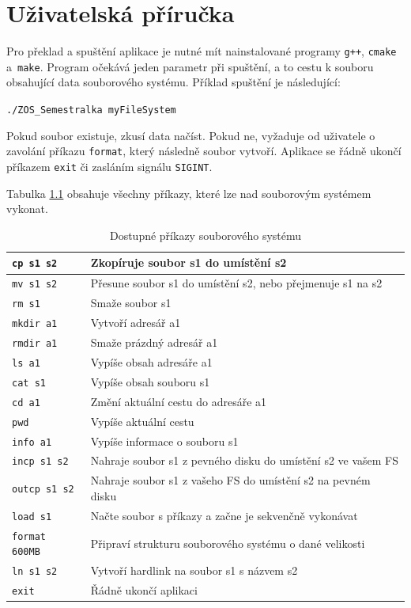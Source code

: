 \documentclass[12pt]{report}
\newcommand\indentt[1]{						
	\setlength\parindent{5mm}
	#1
	\setlength\parindent{0mm}
}
\begin{document}
		
	\chapter{Uživatelská příručka}
	Pro překlad a spuštění aplikace je nutné mít nainstalované programy \texttt{g++}, \texttt{cmake} a~\texttt{make}. Program očekává jeden parametr při spuštění, a to cestu k souboru obsahující data souborového systému. Příklad spuštění je následující:
	
	\indentt{
		\texttt{./ZOS\_Semestralka myFileSystem}
	}
	
	Pokud soubor existuje, zkusí data načíst. Pokud ne, vyžaduje od uživatele o zavolání příkazu \texttt{format}, který následně soubor vytvoří. Aplikace se řádně ukončí příkazem \texttt{exit} či zasláním signálu \texttt{SIGINT}.
	
	Tabulka \ref{tab:tabulka} obsahuje všechny příkazy, které lze nad souborovým systémem vykonat.
	\begin{table}[H]
		\begin{tabular}{|l|l|}
			\hline
			\texttt{cp s1 s2} & Zkopíruje soubor s1 do umístění s2 \\ \hline
			\texttt{mv s1 s2} & Přesune soubor s1 do umístění s2, nebo přejmenuje s1 na s2 \\ \hline
			\texttt{rm s1} & Smaže soubor s1 \\ \hline
			\texttt{mkdir a1} & Vytvoří adresář a1 \\ \hline
			\texttt{rmdir a1} & Smaže prázdný adresář a1 \\ \hline
			\texttt{ls a1} & Vypíše obsah adresáře a1 \\ \hline
			\texttt{cat s1} & Vypíše obsah souboru s1 \\ \hline
			\texttt{cd a1} & Změní aktuální cestu do adresáře a1 \\ \hline
			\texttt{pwd} & Vypíše aktuální cestu \\ \hline
			\texttt{info a1} & Vypíše informace o souboru s1 \\ \hline
			\texttt{incp s1 s2} & Nahraje soubor s1 z pevného disku do umístění s2 ve vašem FS \\ \hline
			\texttt{outcp s1 s2} & Nahraje soubor s1 z vašeho FS do umístění s2 na pevném disku \\ \hline
			\texttt{load s1} & Načte soubor s příkazy a začne je sekvenčně vykonávat \\ \hline
			\texttt{format 600MB} & Připraví strukturu souborového systému o dané velikosti \\ \hline
			\texttt{ln s1 s2} & Vytvoří hardlink na soubor s1 s názvem s2 \\ \hline
			\texttt{exit} & Řádně ukončí aplikaci \\ \hline
		\end{tabular}
		\caption{Dostupné příkazy souborového systému}
		\label{tab:tabulka}
	\end{table}
	
\end{document}
